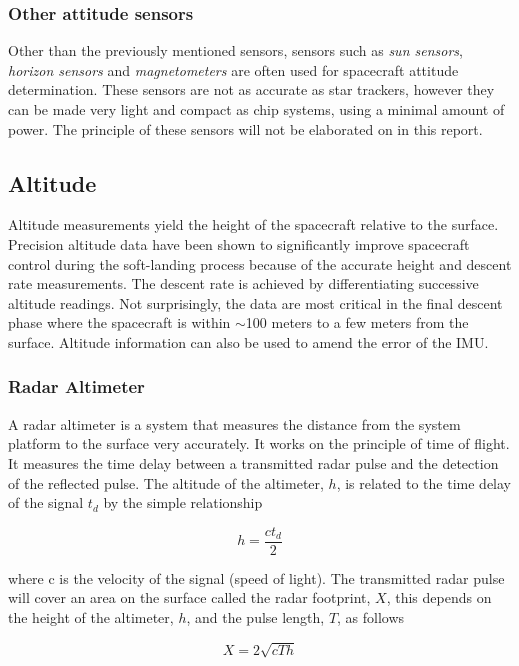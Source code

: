 \subsubsection{Other attitude sensors}
Other than the previously mentioned sensors, sensors such as \textit{sun sensors}, \textit{horizon sensors} and \textit{magnetometers} are often used for spacecraft attitude determination. These sensors are not as accurate as star trackers, however they can be made very light and compact as chip systems, using a minimal amount of power. The principle of these sensors will not be elaborated on in this report. 


\subsection{Altitude}
Altitude measurements yield the height of the spacecraft relative to the surface. Precision altitude data have been shown to significantly improve spacecraft control during the soft-landing process because of the accurate height and descent rate measurements. The descent rate is achieved by differentiating successive altitude readings. Not surprisingly, the data are most critical in the final descent phase where the spacecraft is within $\sim$100 meters to a few meters from the surface. Altitude information can also be used to amend the error of the IMU. 


\subsubsection{Radar Altimeter}
A radar altimeter is a system that measures the distance from the system platform to the surface very accurately. It works on the principle of time of flight. It measures the time delay between a transmitted radar pulse and the detection of the reflected pulse. The altitude of the altimeter, $h$, is related to the time delay of the signal $t_d$ by the simple relationship 

\begin{equation}
h=\dfrac{c t_d}{2}
\end{equation}

where c is the velocity of the signal (speed of light)\cite{henningalt}. The transmitted radar pulse will cover an area on the surface called the radar footprint, $X$, this depends on the height of the altimeter, $h$, and the pulse length, $T$, as follows 

\begin{equation}
X=2\sqrt{cTh}
\end{equation}

